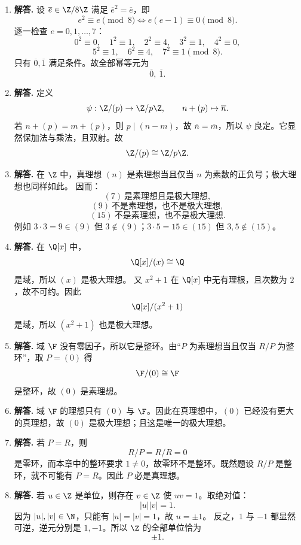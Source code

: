 \begin{enumerate}[label=\textbf{\arabic*.}, leftmargin=*, itemsep=1em]
  \item \textbf{解答.} 设 $\overline e\in\Z/8\Z$ 满足 $\overline e^2=\overline e$，即
  \[
  e^2\equiv e\pmod 8\Longleftrightarrow e(e-1)\equiv0\pmod 8.
  \]
  逐一检查 $e=0,1,\dots,7$：
  \[
  0^2\equiv0,\quad 1^2\equiv1,\quad
  2^2\equiv4,\quad 3^2\equiv1,\quad 4^2\equiv0,
  \]
  \[
  5^2\equiv1,\quad 6^2\equiv4,\quad 7^2\equiv1 \pmod 8.
  \]
  只有 $\overline0,\overline1$ 满足条件。故全部幂等元为
  \[
  \overline0,\ \overline1.
  \]

  \item \textbf{解答.} 定义
  \[
  \psi:\Z/(p)\to \Z/p\Z,\qquad n+(p)\mapsto \overline n.
  \]
  若 $n+(p)=m+(p)$，则 $p\mid(n-m)$，故 $\overline n=\overline m$，所以 $\psi$ 良定。它显然保加法与乘法，且双射。故
  \[
  \Z/(p)\cong \Z/p\Z.
  \]

  \item \textbf{解答.} 在 $\Z$ 中，真理想 $(n)$ 是素理想当且仅当 $n$ 为素数的正负号；极大理想也同样如此。  
  因而：
  \[
  (7)\ \text{是素理想且是极大理想},
  \]
  \[
  (9)\ \text{不是素理想，也不是极大理想},
  \]
  \[
  (15)\ \text{不是素理想，也不是极大理想}.
  \]
  例如 $3\cdot3=9\in(9)$ 但 $3\notin(9)$；$3\cdot5=15\in(15)$ 但 $3,5\notin(15)$。

  \item \textbf{解答.} 在 $\Q[x]$ 中，
  \[
  \Q[x]/(x)\cong \Q
  \]
  是域，所以 $(x)$ 是极大理想。  
  又 $x^2+1$ 在 $\Q[x]$ 中无有理根，且次数为 $2$，故不可约。因此
  \[
  \Q[x]/(x^2+1)
  \]
  是域，所以 $(x^2+1)$ 也是极大理想。

  \item \textbf{解答.} 域 $\F$ 没有零因子，所以它是整环。由“$P$ 为素理想当且仅当 $R/P$ 为整环”，取 $P=(0)$ 得
  \[
  \F/(0)\cong \F
  \]
  是整环，故 $(0)$ 是素理想。

  \item \textbf{解答.} 域 $\F$ 的理想只有 $(0)$ 与 $\F$。因此在真理想中，$(0)$ 已经没有更大的真理想，故 $(0)$ 是极大理想；且这是唯一的极大理想。

  \item \textbf{解答.} 若 $P=R$，则
  \[
  R/P=R/R=0
  \]
  是零环，而本章中的整环要求 $1\neq0$，故零环不是整环。既然题设 $R/P$ 是整环，就不可能有 $P=R$。因此 $P$ 必是真理想。

  \item \textbf{解答.} 若 $u\in\Z$ 是单位，则存在 $v\in\Z$ 使 $uv=1$。取绝对值：
  \[
  |u||v|=1.
  \]
  因为 $|u|,|v|\in\N$，只能有 $|u|=|v|=1$，故 $u=\pm1$。  
  反之，$1$ 与 $-1$ 都显然可逆，逆元分别是 $1,-1$。所以 $\Z$ 的全部单位恰为
  \[
  \pm1.
  \]


\end{enumerate}
